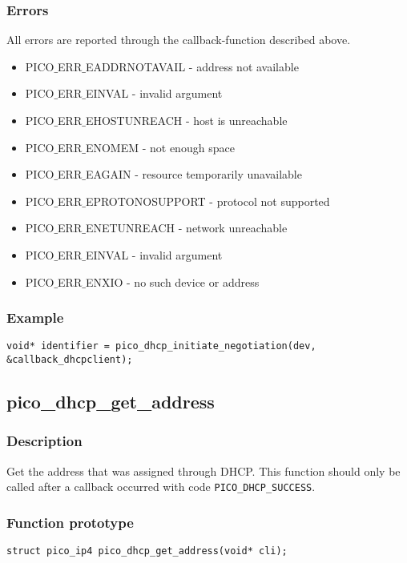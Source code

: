 \subsubsection*{Errors}
All errors are reported through the callback-function described above.
\begin{itemize}
\item PICO$\_$ERR$\_$EADDRNOTAVAIL - address not available
\item PICO$\_$ERR$\_$EINVAL - invalid argument
\item PICO$\_$ERR$\_$EHOSTUNREACH - host is unreachable
\item PICO$\_$ERR$\_$ENOMEM - not enough space
\item PICO$\_$ERR$\_$EAGAIN - resource temporarily unavailable
\item PICO$\_$ERR$\_$EPROTONOSUPPORT - protocol not supported
\item PICO$\_$ERR$\_$ENETUNREACH - network unreachable 
\item PICO$\_$ERR$\_$EINVAL - invalid argument
\item PICO$\_$ERR$\_$ENXIO - no such device or address
\end{itemize}

\subsubsection*{Example}
\begin{verbatim}
void* identifier = pico_dhcp_initiate_negotiation(dev, &callback_dhcpclient);
\end{verbatim}


\subsection{pico\_dhcp\_get\_address}

\subsubsection*{Description}
Get the address that was assigned through DHCP. This function should only be called after a callback occurred with code \texttt{PICO\_DHCP\_SUCCESS}. 

\subsubsection*{Function prototype}
\texttt{struct pico\_ip4 pico\_dhcp\_get\_address(void* cli);}

